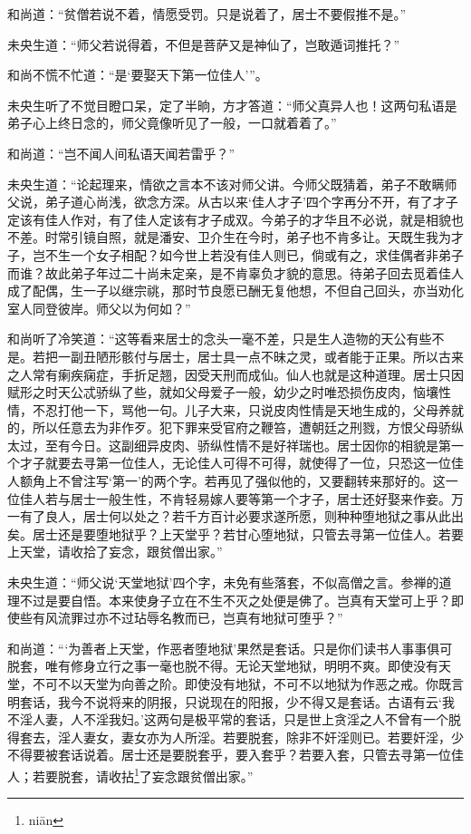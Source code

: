 \documentclass[a4paper,12pt,UTF8,twoside]{ctexbook}
\begin{document}
和尚道：“贫僧若说不着，情愿受罚。只是说着了，居士不要假推不是。”

未央生道：“师父若说得着，不但是菩萨又是神仙了，岂敢遁词推托？”

和尚不慌不忙道：“是‘要娶天下第一位佳人’”。

未央生听了不觉目瞪口呆，定了半晌，方才答道：“师父真异人也！这两句私语是弟子心上终日念的，师父竟像听见了一般，一口就着着了。”

和尚道：“岂不闻人间私语天闻若雷乎？”

未央生道：“论起理来，情欲之言本不该对师父讲。今师父既猜着，弟子不敢瞒师父说，弟子道心尚浅，欲念方深。从古以来‘佳人才子’四个字再分不开，有了才子定该有佳人作对，有了佳人定该有才子成双。今弟子的才华且不必说，就是相貌也不差。时常引镜自照，就是潘安、卫介生在今时，弟子也不肯多让。天既生我为才子，岂不生一个女子相配？如今世上若没有佳人则已，倘或有之，求佳偶者非弟子而谁？故此弟子年过二十尚未定亲，是不肯辜负才貌的意思。待弟子回去觅着佳人成了配偶，生一子以继宗祧，那时节良愿已酬无复他想，不但自己回头，亦当劝化室人同登彼岸。师父以为何如？”

和尚听了冷笑道：“这等看来居士的念头一毫不差，只是生人造物的天公有些不是。若把一副丑陋形骸付与居士，居士具一点不昧之灵，或者能于正果。所以古来之人常有瘌疾痫症，手折足翘，因受天刑而成仙。仙人也就是这种道理。居士只因赋形之时天公忒骄纵了些，就如父母爱子一般，幼少之时唯恐损伤皮肉，恼壤性情，不忍打他一下，骂他一句。儿子大来，只说皮肉性情是天地生成的，父母养就的，所以任意去为非作歹。犯下罪来受官府之鞭笞，遭朝廷之刑戮，方恨父母骄纵太过，至有今日。这副细异皮肉、骄纵性情不是好祥瑞也。居士因你的相貌是第一个才子就要去寻第一位佳人，无论佳人可得不可得，就使得了一位，只恐这一位佳人额角上不曾注写‘第一’的两个字。若再见了强似他的，又要翻转来那好的。这一位佳人若与居士一般生性，不肯轻易嫁人要等第一个才子，居士还好娶来作妾。万一有了良人，居士何以处之？若千方百计必要求遂所愿，则种种堕地狱之事从此出矣。居士还是要堕地狱乎？上天堂乎？若甘心堕地狱，只管去寻第一位佳人。若要上天堂，请收拾了妄念，跟贫僧出家。”

未央生道：“师父说‘天堂地狱’四个字，未免有些落套，不似高僧之言。参禅的道理不过是要自悟。本来使身子立在不生不灭之处便是佛了。岂真有天堂可上乎？即使些有风流罪过亦不过玷辱名教而已，岂真有地狱可堕乎？”

和尚道：“‘为善者上天堂，作恶者堕地狱’果然是套话。只是你们读书人事事俱可脱套，唯有修身立行之事一毫也脱不得。无论天堂地狱，明明不爽。即使没有天堂，不可不以天堂为向善之阶。即使没有地狱，不可不以地狱为作恶之戒。你既言明套话，我今不说将来的阴报，只说现在的阳报，少不得又是套话。古语有云‘我不淫人妻，人不淫我妇。’这两句是极平常的套话，只是世上贪淫之人不曾有一个脱得套去，淫人妻女，妻女亦为人所淫。若要脱套，除非不奸淫则已。若要奸淫，少不得要被套话说着。居士还是要脱套乎，要入套乎？若要入套，只管去寻第一位佳人；若要脱套，请收拈\footnote{ni\=an}了妄念跟贫僧出家。”
\end{document}

